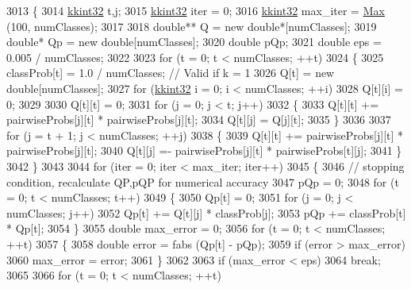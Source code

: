 \begin{DoxyCode}
3013 \{
3014   \hyperlink{namespace_k_k_b_a8fa4952cc84fda1de4bec1fbdd8d5b1b}{kkint32} t,j;
3015   \hyperlink{namespace_k_k_b_a8fa4952cc84fda1de4bec1fbdd8d5b1b}{kkint32}  iter     = 0;
3016   \hyperlink{namespace_k_k_b_a8fa4952cc84fda1de4bec1fbdd8d5b1b}{kkint32}  max\_iter = \hyperlink{namespace_k_k_b_a25e187e24c091586293725f27f007ad7}{Max} (100, numClasses);
3017 
3018   \textcolor{keywordtype}{double}**  Q  = \textcolor{keyword}{new} \textcolor{keywordtype}{double}*[numClasses];
3019   \textcolor{keywordtype}{double}*   Qp = \textcolor{keyword}{new} \textcolor{keywordtype}{double}[numClasses];
3020   \textcolor{keywordtype}{double}    pQp; 
3021   \textcolor{keywordtype}{double}    eps = 0.005 / numClasses;
3022   
3023   \textcolor{keywordflow}{for}  (t = 0;  t < numClasses;  ++t)
3024   \{
3025     classProb[t] = 1.0 / numClasses;  \textcolor{comment}{// Valid if k = 1}
3026     Q[t]    = \textcolor{keyword}{new} \textcolor{keywordtype}{double}[numClasses];
3027     \textcolor{keywordflow}{for}  (\hyperlink{namespace_k_k_b_a8fa4952cc84fda1de4bec1fbdd8d5b1b}{kkint32} i = 0;  i < numClasses;  ++i)
3028       Q[t][i] = 0;
3029 
3030     Q[t][t] = 0;
3031     \textcolor{keywordflow}{for}  (j = 0;  j < t;  j++)
3032     \{
3033       Q[t][t] += pairwiseProbs[j][t] * pairwiseProbs[j][t];
3034       Q[t][j] =  Q[j][t];
3035     \}
3036 
3037     \textcolor{keywordflow}{for}  (j = t + 1;  j < numClasses;  ++j)
3038     \{
3039       Q[t][t] +=  pairwiseProbs[j][t] * pairwiseProbs[j][t];
3040       Q[t][j] =-  pairwiseProbs[j][t] * pairwiseProbs[t][j];
3041     \}
3042   \}
3043 
3044   \textcolor{keywordflow}{for} (iter = 0;  iter < max\_iter;  iter++)
3045   \{
3046     \textcolor{comment}{// stopping condition, recalculate QP,pQP for numerical accuracy}
3047     pQp = 0;
3048     \textcolor{keywordflow}{for} (t = 0;  t < numClasses;  t++)
3049     \{
3050       Qp[t] = 0;
3051       \textcolor{keywordflow}{for}  (j = 0;  j < numClasses;  j++)
3052         Qp[t] += Q[t][j] * classProb[j];
3053       pQp += classProb[t] * Qp[t];
3054     \}
3055     \textcolor{keywordtype}{double} max\_error = 0;
3056     \textcolor{keywordflow}{for} (t = 0;  t < numClasses;  ++t)
3057     \{
3058       \textcolor{keywordtype}{double} error = fabs (Qp[t] - pQp);
3059       \textcolor{keywordflow}{if}  (error > max\_error)
3060         max\_error = error;
3061     \}
3062 
3063     \textcolor{keywordflow}{if}  (max\_error < eps) 
3064       \textcolor{keywordflow}{break};
3065     
3066     \textcolor{keywordflow}{for}  (t = 0;  t < numClasses;  ++t)

\end{DoxyCode}
